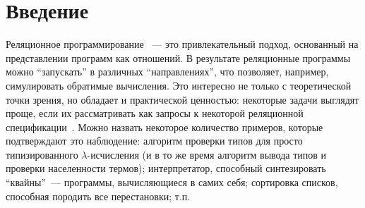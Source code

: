 
\section{Введение}
\label{intro}

Реляционное программирование~\cite{TRS} --- это привлекательный подход, основанный на представлении программ как отношений.
В результате реляционные программы можно \enquote{запускать} в различных \enquote{направлениях}, что позволяет, например, симулировать обратимые вычисления.
Это интересно не только с теоретической точки зрения, но обладает и практической ценностью: некоторые задачи выглядят проще, если их рассматривать как запросы к некоторой реляционной спецификации~\cite{WillThesis}.
Можно назвать некоторое количество примеров, которые подтверждают это наблюдение:
алгоритм проверки типов для просто типизированного $\lambda$-исчисления (и в то же время алгоритм вывода типов и проверки населенности термов);
интерпретатор, способный синтезировать \enquote{квайны}~--- программы, вычисляющиеся в самих себя;
сортировка списков, способная породить все перестановки; т.п.

